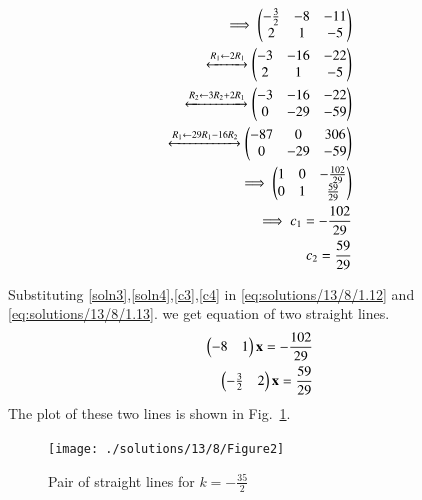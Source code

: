 \begin{align}
    \implies\begin{pmatrix}-\frac{3}{2} & -8 & -11\\2 & 1 & -5\end{pmatrix}\\
    \xleftrightarrow[]{R_1\leftarrow 2R_1}\begin{pmatrix}-3 & -16 & -22\\2 & 1 & -5\end{pmatrix}\\
    \xleftrightarrow[]{R_2\leftarrow 3R_2+2R_1}\begin{pmatrix}-3 & -16 & -22\\0 & -29 & -59\end{pmatrix}\\
    \xleftrightarrow[]{R_1\leftarrow 29R_1-16R_2}\begin{pmatrix}-87 & 0 & 306\\0 & -29 & -59\end{pmatrix}\\
    \implies\begin{pmatrix}1 & 0 & -\frac{102}{29}\\0 & 1 & \frac{59}{29}\end{pmatrix}\\
    \implies c_1=-\frac{102}{29}\label{c3}\\
    c_2=\frac{59}{29}\label{c4}
\end{align}

Substituting \eqref{soln3},\eqref{soln4},\eqref{c3},\eqref{c4} in \eqref{eq:solutions/13/8/1.12} and \eqref{eq:solutions/13/8/1.13}. we get equation of two straight lines.
\begin{align}
    \begin{pmatrix}-8 & 1\end{pmatrix}\mathbf{x}=-\frac{102}{29}\\
    \begin{pmatrix}-\frac{3}{2} & 2\end{pmatrix}\mathbf{x}=\frac{59}{29}
\end{align}
\newpage
The plot of these two lines is shown in Fig.~\ref{fig:solutions/13/8/figure2}.
\begin{figure}[ht!]
    \centering
    \texttt{[image: ./solutions/13/8/Figure2]}
    \caption{Pair of straight lines for $k=-\frac{35}{2}$}
    \label{fig:solutions/13/8/figure2}
\end{figure}

